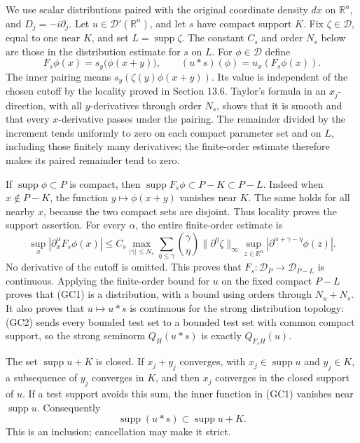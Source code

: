 \documentclass[
  11pt,
]{article}
\begin{document}
We use scalar distributions paired with the original coordinate density
\(dx\) on \(\mathbb R^n\), and \(D_j=-i\partial_j\). Let
\(u\in\mathcal D'(\mathbb R^n)\), and let \(s\) have compact support
\(K\). Fix \(\zeta\in\mathcal D\), equal to one near \(K\), and set
\(L=\operatorname{supp}\zeta\). The constant \(C_s\) and order \(N_s\)
below are those in the distribution estimate for \(s\) on \(L\). For
\(\phi\in\mathcal D\) define \[
 F_s\phi(x)=s_y\bigl(\phi(x+y)\bigr),\qquad
 (u*s)(\phi)=u_x(F_s\phi(x)).
 \tag{GC1}
\] The inner pairing means \(s_y(\zeta(y)\phi(x+y))\). Its value is
independent of the chosen cutoff by the locality proved in Section 13.6.
Taylor's formula in an \(x_j\)-direction, with all \(y\)-derivatives
through order \(N_s\), shows that it is smooth and that every
\(x\)-derivative passes under the pairing. The remainder divided by the
increment tends uniformly to zero on each compact parameter set and on
\(L\), including those finitely many derivatives; the finite-order
estimate therefore makes its paired remainder tend to zero.

If \(\operatorname{supp}\phi\subset P\) is compact, then
\(\operatorname{supp}F_s\phi\subset P-K\subset P-L\). Indeed when
\(x\notin P-K\), the function \(y\mapsto\phi(x+y)\) vanishes near \(K\).
The same holds for all nearby \(x\), because the two compact sets are
disjoint. Thus locality proves the support assertion. For every
\(\alpha\), the entire finite-order estimate is \[
 \sup_x|\partial_x^\alpha F_s\phi(x)|
 \leq C_s\max_{|\gamma|\leq N_s}
 \sum_{\eta\leq\gamma}\binom{\gamma}{\eta}
 \|\partial^\eta\zeta\|_\infty
 \sup_{z\in\mathbb R^n}|\partial^{\alpha+\gamma-\eta}\phi(z)|.
 \tag{GC2}
\] No derivative of the cutoff is omitted. This proves that
\(F_s:\mathcal D_P\to\mathcal D_{P-L}\) is continuous. Applying the
finite-order bound for \(u\) on the fixed compact \(P-L\) proves that
(GC1) is a distribution, with a bound using orders through \(N_u+N_s\).
It also proves that \(u\mapsto u*s\) is continuous for the strong
distribution topology: (GC2) sends every bounded test set to a bounded
test set with common compact support, so the strong seminorm
\(Q_H(u*s)\) is exactly \(Q_{F_sH}(u)\).

The set \(\operatorname{supp}u+K\) is closed. If \(x_j+y_j\) converges,
with \(x_j\in\operatorname{supp}u\) and \(y_j\in K\), a subsequence of
\(y_j\) converges in \(K\), and then \(x_j\) converges in the closed
support of \(u\). If a test support avoids this sum, the inner function
in (GC1) vanishes near \(\operatorname{supp}u\). Consequently \[
 \operatorname{supp}(u*s)\subset\operatorname{supp}u+K.
 \tag{GC3}
\] This is an inclusion; cancellation may make it strict.
\end{document}
